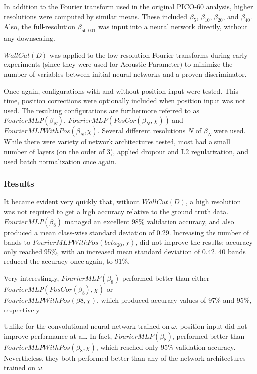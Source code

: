 \documentclass[10pt]{article}
\begin{document}
In addition to the Fourier transform used in the original PICO-60 analysis, higher resolutions were computed by similar means. These included $\beta _{5}$, $\beta _{10}$, $\beta _{20}$, and $\beta _{40}$. Also, the full-resolution $\beta _{50,001}$ was input into a neural network directly, without any downscaling.

$WallCut(D)$ was applied to the low-resolution Fourier transforms during early experiments (since they were used for Acoustic Parameter) to minimize the number of variables between initial neural networks and a proven discriminator.

Once again, configurations with and without position input were tested. This time, position corrections were optionally included when position input was not used. The resulting configurations are furthermore referred to as $FourierMLP(\beta_{N})$, $FourierMLP(PosCor(\beta_{N}, \chi))$ and $FourierMLPWithPos(\beta_{N}, \chi)$. Several different resolutions $N$ of $\beta_{N}$ were used. While there were variety of network architectures tested, most had a small number of layers (on the order of 3), applied dropout and L2 regularization, and used batch normalization once again.

\subsubsection{Results}

It became evident very quickly that, without $WallCut(D)$, a high resolution was not required to get a high accuracy relative to the ground truth data. $FourierMLP(\beta_{8})$ managed an excellent 98\% validation accuracy, and also produced a mean class-wise standard deviation of 0.29. Increasing the number of bands to $FourierMLPWithPos(beta_{20}, \chi)$, did not improve the results; accuracy only reached 95\%, with an increased mean standard deviation of 0.42. 40 bands reduced the accuracy once again, to 91\%.

Very interestingly, $FourierMLP(\beta_{8})$ performed better than either $FourierMLP(PosCor(\beta_{8}), \chi)$ or \\ $FourierMLPWithPos(\beta{8}, \chi)$, which produced accuracy values of 97\% and 95\%, respectively.

Unlike for the convolutional neural network trained on $\omega$, position input did not improve performance at all. In fact, $FourierMLP(\beta_{8})$, performed better than $FourierMLPWithPos(\beta_{8}, \chi)$, which reached only 95\% validation accuracy. Nevertheless, they both performed better than any of the network architectures trained on $\omega$.
\end{document}
